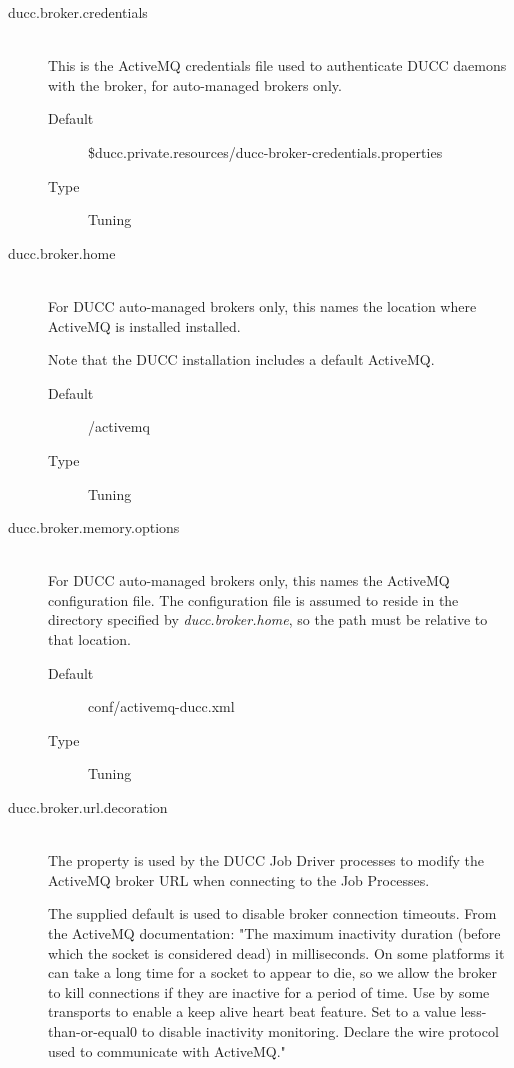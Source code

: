 \begin{description}
       \item[ducc.broker.credentials] \hfill \\
         This is the ActiveMQ credentials file used to authenticate DUCC daemons with the broker, for
         auto-managed brokers only.
         \begin{description}
           \item[Default] \${ducc.private.resources}/ducc-broker-credentials.properties
           \item[Type] Tuning
         \end{description} 

       \item[ducc.broker.home] \hfill \\
         For DUCC auto-managed brokers only, this names the location where ActiveMQ is installed
         installed.  

         Note that the DUCC installation includes a default ActiveMQ.
         \begin{description}
           \item[Default] \duccruntime/activemq 
           \item[Type] Tuning
         \end{description} 
           
       \item[ducc.broker.memory.options] \hfill \\
         For DUCC auto-managed brokers only, this names the ActiveMQ configuration file.  The configuration
         file is assumed to reside in the directory specified by {\em ducc.broker.home}, so the path must be relative
         to that location.
         \begin{description}
           \item[Default] conf/activemq-ducc.xml
           \item[Type] Tuning
         \end{description} 
           
           
       \item[ducc.broker.url.decoration] \hfill \\
         The property is used by the DUCC Job Driver processes to modify the ActiveMQ broker URL
         when connecting to the Job Processes.

         The supplied default is used to disable broker connection timeouts.  From the ActiveMQ
         documentation: "The maximum inactivity duration (before which the socket is considered
         dead) in milliseconds. On some platforms it can take a long time for a socket to appear to
         die, so we allow the broker to kill connections if they are inactive for a period of
         time. Use by some transports to enable a keep alive heart beat feature. Set to a value
         less-than-or-equal0 to disable inactivity monitoring. Declare the wire protocol used to
         communicate with ActiveMQ."
         

\end{description}
